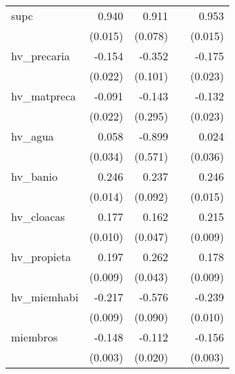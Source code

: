 {\begin{longtable}{l*{4}{D{.}{.}{-1}}}
\addlinespace
supc        &       0.940\sym{***}&       0.911\sym{***}&                     &       0.953\sym{***}\\
            &     (0.015)         &     (0.078)         &                     &     (0.015)         \\
\addlinespace
hv\_precaria &      -0.154\sym{***}&      -0.352\sym{***}&                     &      -0.175\sym{***}\\
            &     (0.022)         &     (0.101)         &                     &     (0.023)         \\
\addlinespace
hv\_matpreca &      -0.091\sym{***}&      -0.143         &                     &      -0.132\sym{***}\\
            &     (0.022)         &     (0.295)         &                     &     (0.023)         \\
\addlinespace
hv\_agua     &       0.058         &      -0.899         &                     &       0.024         \\
            &     (0.034)         &     (0.571)         &                     &     (0.036)         \\
\addlinespace
hv\_banio    &       0.246\sym{***}&       0.237\sym{**} &                     &       0.246\sym{***}\\
            &     (0.014)         &     (0.092)         &                     &     (0.015)         \\
\addlinespace
hv\_cloacas  &       0.177\sym{***}&       0.162\sym{***}&                     &       0.215\sym{***}\\
            &     (0.010)         &     (0.047)         &                     &     (0.009)         \\
\addlinespace
hv\_propieta &       0.197\sym{***}&       0.262\sym{***}&                     &       0.178\sym{***}\\
            &     (0.009)         &     (0.043)         &                     &     (0.009)         \\
\addlinespace
hv\_miemhabi &      -0.217\sym{***}&      -0.576\sym{***}&                     &      -0.239\sym{***}\\
            &     (0.009)         &     (0.090)         &                     &     (0.010)         \\
\addlinespace
miembros    &      -0.148\sym{***}&      -0.112\sym{***}&                     &      -0.156\sym{***}\\
            &     (0.003)         &     (0.020)         &                     &     (0.003)         \\

\end{longtable}}
